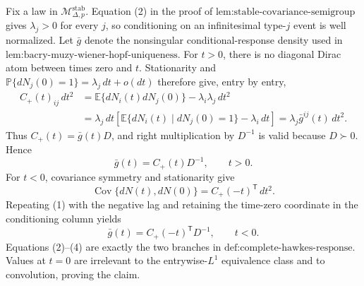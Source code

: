 Fix a law in \(\mathcal M_{\Delta,p}^{\mathrm{stab}}\).  Equation (2) in the proof of \(\text{lem:stable-covariance-semigroup}\) gives \(\lambda_j>0\) for every \(j\), so conditioning on an infinitesimal type-\(j\) event is well normalized.  Let \(\bar g\) denote the nonsingular conditional-response density used in \(\text{lem:bacry-muzy-wiener-hopf-uniqueness}\).  For \(t>0\), there is no diagonal Dirac atom between times zero and \(t\).  Stationarity and \(\mathbb P\{dN_j(0)=1\}=\lambda_j\,dt+o(dt)\) therefore give, entry by entry,
\[
 \begin{aligned}
 C_{+}(t)_{ij}\,dt^2
 &=\mathbb E\{dN_i(t)dN_j(0)\}-\lambda_i\lambda_j\,dt^2\\
 &=\lambda_j\,dt\left[
   \mathbb E\{dN_i(t)\mid dN_j(0)=1\}-\lambda_i\,dt
  \right]
 =\lambda_j\bar g^{ij}(t)\,dt^2.
 \end{aligned}
\tag{1}
\]
Thus \(C_{+}(t)=\bar g(t)D\), and right multiplication by \(D^{-1}\) is valid because \(D\succ0\).  Hence
\[
 \bar g(t)=C_{+}(t)D^{-1},\qquad t>0.
\tag{2}
\]
For \(t<0\), covariance symmetry and stationarity give
\[
 \operatorname{Cov}\{dN(t),dN(0)\}
 =C_{+}(-t)^{\mathsf T}\,dt^2.
\tag{3}
\]
Repeating (1) with the negative lag and retaining the time-zero coordinate in the conditioning column yields
\[
 \bar g(t)=C_{+}(-t)^{\mathsf T}D^{-1},\qquad t<0.
\tag{4}
\]
Equations (2)--(4) are exactly the two branches in \(\text{def:complete-hawkes-response}\).  Values at \(t=0\) are irrelevant to the entrywise-\(L^1\) equivalence class and to convolution, proving the claim.